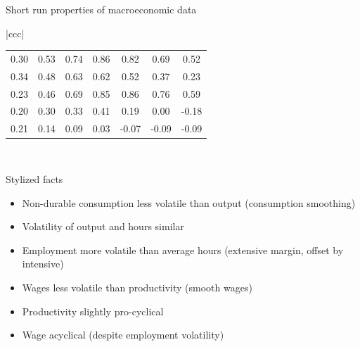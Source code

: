 \begin{frame}{Short run properties of macroeconomic data}
\begin{center}
\begin{table}
\begin{tabular}{|ccc|}
\begin{tabular}{ccccccc}
{\small 0.30} & {\small 0.53} & {\small 0.74} & {\small 0.86} & {\small 0.82}
& {\small 0.69} & {\small 0.52} \\ 
{\small 0.34} & {\small 0.48} & {\small 0.63} & {\small 0.62} & {\small 0.52}
& {\small 0.37} & {\small 0.23} \\ 
{\small 0.23} & {\small 0.46} & {\small 0.69} & {\small 0.85} & {\small 0.86}
& {\small 0.76} & {\small 0.59} \\ 
{\small 0.20} & {\small 0.30} & {\small 0.33} & {\small 0.41} & {\small 0.19}
& {\small 0.00} & {\small -0.18} \\ 
{\small 0.21} & {\small 0.14} & {\small 0.09} & {\small 0.03} & {\small -0.07
} & {\small -0.09} & {\small -0.09}
\end{tabular}
\\ \hline
\end{tabular}
\end{table}
\end{center}

\end{frame}


\begin{frame}{Stylized facts}

\begin{itemize}
\item 	Non-durable consumption less volatile than output (consumption smoothing)
\item 	Volatility of output and hours similar
\item 	Employment more volatile than average hours (extensive margin, offset by intensive)
\item 	Wages less volatile than productivity (smooth wages)
\item 	Productivity slightly pro-cyclical
\item 	Wage acyclical (despite employment volatility)
\end{itemize}

\end{frame}